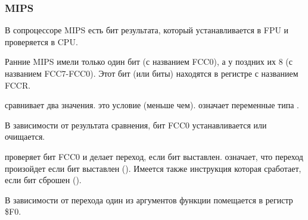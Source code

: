 \subsubsection{MIPS}


В сопроцессоре MIPS есть бит результата, который устанавливается в FPU и проверяется в CPU.

Ранние MIPS имели только один бит (с названием FCC0), а у поздних их 8 (с названием FCC7-FCC0).
Этот бит (или биты) находятся в регистре с названием FCCR.



 сравнивает два значения. 
 это условие  (меньше чем).
 означает переменные типа \Tdouble.

В зависимости от результата сравнения, бит FCC0 устанавливается или очищается.

 проверяет бит FCC0 и делает переход, если бит выставлен.
 означает, что переход произойдет если бит выставлен ().
Имеется также инструкция  которая сработает, если бит сброшен ().

В зависимости от перехода один из аргументов функции помещается в регистр \$F0.

